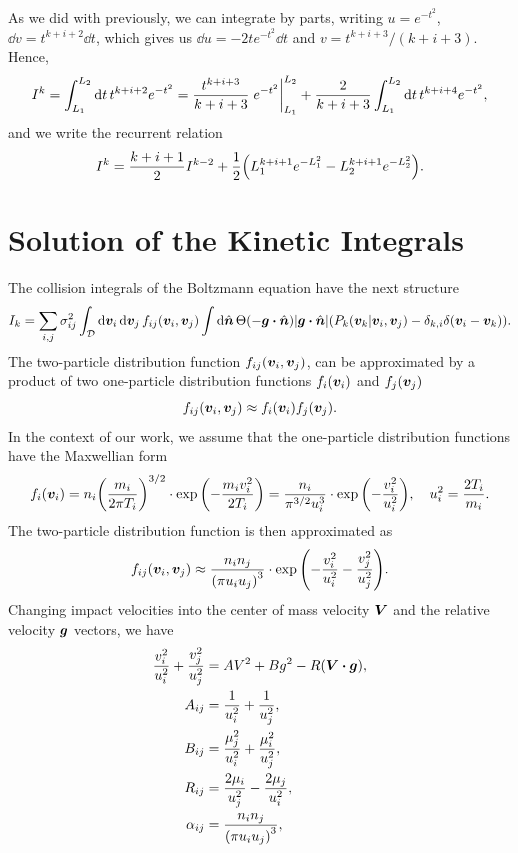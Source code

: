 \documentclass[aps,prl,preprint,groupedaddress,10pt]{revtex4-2}
\begin{document}
As we did with previously, we can integrate by parts, writing $u=e^{-t^2}$, $\dd{v}=t^{k+i+2}\dd{t}$,
which gives us $\dd{u}=-2te^{-t^2}\dd{t}$ and $v=t^{k+i+3}/(k+i+3)$. Hence,
\begin{equation}
    I^{k}=\int_{L_1}^{L_2}\dd{t}t^{k+i+2}e^{-t^2}=\frac{t^{k+i+3}}{k+i+3}\eval{e^{-t^2}}_{L_1}^{L_2}+
    \frac{2}{k+i+3}\int_{L_1}^{L_2}\dd{t}t^{k+i+4}e^{-t^2},
\end{equation}
and we write the recurrent relation
\begin{equation}
    I^{k}=\frac{k+i+1}{2}I^{k-2}+\frac{1}{2}\pqty{L_1^{k+i+1}e^{-L_1^2}-L_2^{k+i+1}e^{-L_2^2}}.
\end{equation}

\section{Solution of the Kinetic Integrals}
The collision integrals of the Boltzmann equation have the next structure
\begin{equation}
    I_k = \sum_{i,j}\sigma_{ij}^2\int_{\mathcal{D}}\dd{\bv_i}\dd{\bv_j}f_{ij}(\bv_i,\bv_j)
    \int\dd{\bn}\Theta\pqty{-\bg\vdot\bn}\abs{\bg\vdot\bn}
    \pqty{P_k(\bv_k\vert\bv_i,\bv_j)-\delta_{k,i}\delta\pqty{\bv_i-\bv_k}}.
\end{equation}
The two-particle distribution function $f_{ij}(\vb*{v}_i,\vb*{v}_j)$, can be approximated by a product of
two one-particle distribution functions $f_i(\vb*{v}_i)$ and $f_j(\vb*{v}_j)$
\begin{equation}
    f_{ij}(\vb*{v}_i,\vb*{v}_j)\approx f_i(\vb*{v}_i)f_j(\vb*{v}_j).
\end{equation}
In the context of our work, we assume that the one-particle distribution functions have the
Maxwellian form
\begin{equation}
    f_i(\bv_i)=n_i\pqty{\frac{m_i}{2\pi T_i}}^{3/2}\cdot\exp\pqty{-\frac{m_iv_i^2}{2T_i}}=
    \frac{n_i}{\pi^{3/2}u_i^3}\cdot\exp\pqty{-\frac{v_i^2}{u_i^2}},\quad
    u_i^2=\frac{2T_i}{m_i}.
\end{equation}
The two-particle distribution function is then approximated as
\begin{equation}
    f_{ij}(\bv_i,\bv_j)\approx\frac{n_in_j}{\pqty{\pi u_i u_j}^3}\cdot
    \exp\pqty{-\frac{v_i^2}{u_i^2}-\frac{v_j^2}{u_j^2}}.
\end{equation}
Changing impact velocities into the center of mass velocity $\vb*{V}$ and the relative velocity $\vb*{g}$
vectors, we have
\begin{equation}
    \begin{split}
        \frac{v_i^2}{u_i^2}+\frac{v_j^2}{u_j^2}&=AV^2+Bg^2-R\pqty{\bV\vdot\bg},\\
        A_{ij}&=\frac{1}{u_i^2}+\frac{1}{u_j^2},\\
        B_{ij}&=\frac{\mu_j^2}{u_i^2}+\frac{\mu_i^2}{u_j^2},\\
        R_{ij}&=\frac{2\mu_i}{u_j^2}-\frac{2\mu_j}{u_i^2},\\
        \alpha_{ij}&=\frac{n_in_j}{\pqty{\pi u_iu_j}^3},
    \end{split}
\end{equation}
\end{document}
